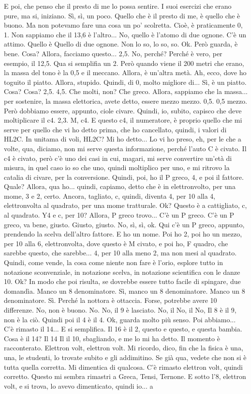 \begin{soluzione}
{   E poi, che penso che il presto di me lo possa sentire. I suoi esercizi che erano pure, ma si, iniziano. Sì, sì, un poco. Quello che è il presto di me, è quello che è buono. Ma non potevamo fare una cosa un po' scolretta. Cioè, è praticamente 0, 1. Non sappiamo che il 13,6 è l'altro... No, quello è l'atomo di due ognone. C'è un attimo. Quello è Quello di due ognone. Non lo so, lo so, so. Ok. Però guarda, è bene. Cosa? Allora, facciamo questo... 2,5. No, perché? Perché è vero, per esempio, il 12,5. Qua si semplifia un 2. Però quando viene il 200 metri che erano, la massa del tono è la 0,5 e il meccano. Allora, è un'altra metà. Ah, ecco, dove ho toguito il piatto. Allora, stupido. Quindi, di 0, molto migliore di... Sì, è un piatto. Cosa? Cosa? 2,5. 4,5. Che molti, non? Che greco. Allora, sappiamo che la massa... per sostenire, la massa elettorica, avete detto, essere mezzo mezzo. 0,5. 0,5 mezzo. Però dobbiamo essere, appunto, ciole civare. Quindi, io, subito, capisco che deve moltiplicare il c4. 2,3. M, c4. E questo c4, il numeratore, è proprio quello che mi serve per quello che vi ho detto prima, che ho cancellato, quindi, i valori di HL2C. In unitama di voli, HL2C? Mi ho detto... Lo vi ho preso, eh, per le che a volte, qua, diciamo, non mi serve questa informazione, perché l'auto C è civato. Il c4 è civato, però c'è uno dei casi in cui, magari, mi serve convertire un'età di misura, in quel caso io so che uno, quindi moltiplico per uno, e mi ritrovo la catalia di civare, per la conversione. Quindi, poi, ho il P greco, 4, e poi il fattore. Quale? Allora, qua ho... quindi, capiamo, detto che è in elettronvolto, per una mome, 3 e 2, certo. Ancora, tagliato, c, quindi, diventa 4, per 10 alla 4, elettronvolta al quadrato, per una mome tratturale. Ok? Questo è a cattigliato, c, al quadrato. Y4 e c, per 10? Allora, P greco trovo... C'è un P greco. C'è un P greco, va bene, giusto. Giusto, giusto. No, sì, sì, ok. Qui c'è un P greco, appunto, prendendo la scelva dell'altro fattore. E ho un nome. Poi ho 2, poi ho un mezzo, per 10 alla 6, elettronvolta, dove questo è M civato, e poi ho, F quadro, che sarebbe questo, che sarebbe... 4, per 10 alla meno 2, ma non mesi al quadrato. Quindi, come vende, la cosa come niente non fare è l'orio, esplore tutto in notazione sconvenziale, in notazione scelva, in notazione scientifica con le danze 10. Ok? In modo che poi risulta, se dovrebbe essere tutto facile di spingare, due domandìa. Manco un 8 denominatore. Sì, manco un 8 denominatore. Manco un 8 denominatore. Sì. Perché la nottora è ottaccia. Forse, potrebbe avere 10 differenze. No, non è buono. No. No, il 9 è lasciato. No, il No, il No, Il 8 è il 9, non è la ciò. Quindi poi il 4 è il 4. Ok, guarda molto più senso. Poi abbiamo... C'è rimasto il 14... E si semplifica. Il 16 è il 2, questo e questo, e questa bambia. Cosa è il 14? Il 14 Il il 10, sbagliando, e me lo mi ha detto. Il momento è racconterato. Elettron volt, elettron volt. Mi ricordo, dico, fin che la fisica è una, una, le studenti, lo trovate subito e gli addimitino. Se già qua, vedete che non si è tutta quella corretta. Mi dimentica di qualcosa. C'è rimasto elettron volt, quindi corretto. Questo mi sembra rimastri a Greca, Tensi, Ternone. E sotto l'8, elettron volt, e si trova, lo avevo dimenticato, quindi io... a }
\end{soluzione}
